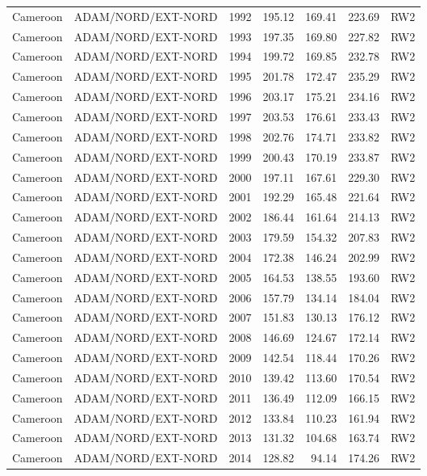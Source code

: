 \begin{longtable}{lllrrrl}
  Cameroon & ADAM/NORD/EXT-NORD & 1992 & 195.12 & 169.41 & 223.69 & RW2 \\ 
  Cameroon & ADAM/NORD/EXT-NORD & 1993 & 197.35 & 169.80 & 227.82 & RW2 \\ 
  Cameroon & ADAM/NORD/EXT-NORD & 1994 & 199.72 & 169.85 & 232.78 & RW2 \\ 
  Cameroon & ADAM/NORD/EXT-NORD & 1995 & 201.78 & 172.47 & 235.29 & RW2 \\ 
  Cameroon & ADAM/NORD/EXT-NORD & 1996 & 203.17 & 175.21 & 234.16 & RW2 \\ 
  Cameroon & ADAM/NORD/EXT-NORD & 1997 & 203.53 & 176.61 & 233.43 & RW2 \\ 
  Cameroon & ADAM/NORD/EXT-NORD & 1998 & 202.76 & 174.71 & 233.82 & RW2 \\ 
  Cameroon & ADAM/NORD/EXT-NORD & 1999 & 200.43 & 170.19 & 233.87 & RW2 \\ 
  Cameroon & ADAM/NORD/EXT-NORD & 2000 & 197.11 & 167.61 & 229.30 & RW2 \\ 
  Cameroon & ADAM/NORD/EXT-NORD & 2001 & 192.29 & 165.48 & 221.64 & RW2 \\ 
  Cameroon & ADAM/NORD/EXT-NORD & 2002 & 186.44 & 161.64 & 214.13 & RW2 \\ 
  Cameroon & ADAM/NORD/EXT-NORD & 2003 & 179.59 & 154.32 & 207.83 & RW2 \\ 
  Cameroon & ADAM/NORD/EXT-NORD & 2004 & 172.38 & 146.24 & 202.99 & RW2 \\ 
  Cameroon & ADAM/NORD/EXT-NORD & 2005 & 164.53 & 138.55 & 193.60 & RW2 \\ 
  Cameroon & ADAM/NORD/EXT-NORD & 2006 & 157.79 & 134.14 & 184.04 & RW2 \\ 
  Cameroon & ADAM/NORD/EXT-NORD & 2007 & 151.83 & 130.13 & 176.12 & RW2 \\ 
  Cameroon & ADAM/NORD/EXT-NORD & 2008 & 146.69 & 124.67 & 172.14 & RW2 \\ 
  Cameroon & ADAM/NORD/EXT-NORD & 2009 & 142.54 & 118.44 & 170.26 & RW2 \\ 
  Cameroon & ADAM/NORD/EXT-NORD & 2010 & 139.42 & 113.60 & 170.54 & RW2 \\ 
  Cameroon & ADAM/NORD/EXT-NORD & 2011 & 136.49 & 112.09 & 166.15 & RW2 \\ 
  Cameroon & ADAM/NORD/EXT-NORD & 2012 & 133.84 & 110.23 & 161.94 & RW2 \\ 
  Cameroon & ADAM/NORD/EXT-NORD & 2013 & 131.32 & 104.68 & 163.74 & RW2 \\ 
  Cameroon & ADAM/NORD/EXT-NORD & 2014 & 128.82 & 94.14 & 174.26 & RW2 \\ 

\end{longtable}
